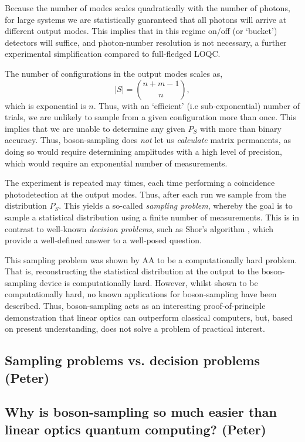 \documentclass[aps,pra,twocolumn,amsmath,amssymb,nofootinbib,superscriptaddress]{revtex4}
\begin{document}
Because the number of modes scales quadratically with the number of photons, for large systems we are statistically guaranteed that all photons will arrive at different output modes. This implies that in this regime on/off (or `bucket') detectors will suffice, and photon-number resolution is not necessary, a further experimental simplification compared to full-fledged LOQC.

The number of configurations in the output modes scales as,
\begin{equation}
|S| = \binom{n+m-1}{n},
\end{equation}
which is exponential is $n$. Thus, with an `efficient' (i.e sub-exponential) number of trials, we are unlikely to sample from a given configuration more than once. This implies that we are unable to determine any given $P_S$ with more than binary accuracy. Thus, boson-sampling does \emph{not} let us \emph{calculate} matrix permanents, as doing so would require determining amplitudes with a high level of precision, which would require an exponential number of measurements.

The experiment is repeated may times, each time performing a coincidence photodetection at the output modes. Thus, after each run we sample from the distribution $P_S$. This yields a so-called \emph{sampling problem}, whereby the goal is to sample a statistical distribution using a finite number of measurements. This is in contrast to well-known \emph{decision problems}, such as Shor's algorithm \cite{bib:Shor97}, which provide a well-defined answer to a well-posed question.

This sampling problem was shown by AA to be a computationally hard problem. That is, reconstructing the statistical distribution at the output to the boson-sampling device is computationally hard. However, whilst shown to be computationally hard, no known applications for boson-sampling have been described. Thus, boson-sampling acts as an interesting proof-of-principle demonstration that linear optics can outperform classical computers, but, based on present understanding, does not solve a problem of practical interest.

\subsection{Sampling problems vs. decision problems (Peter)}

\subsection{Why is boson-sampling so much easier than linear optics quantum computing? (Peter)}
\end{document}
